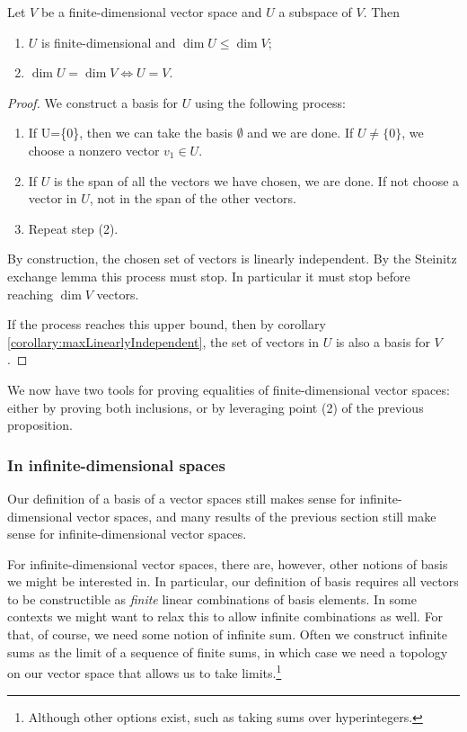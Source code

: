 \begin{proposition}
Let $V$ be a finite-dimensional vector space and $U$ a subspace of $V$. Then
\begin{enumerate}
\item $U$ is finite-dimensional and $\dim U \leq \dim V$;
\item $\dim U = \dim V \iff U=V$.
\end{enumerate}
\label{prop:vectorSpaceEquality}
\end{proposition}
\begin{proof}
We construct a basis for $U$ using the following process:
\begin{enumerate}
\item If U=\{0\}, then we can take the basis $\emptyset$ and we are done. If $U\neq \{0\}$, we choose a nonzero vector $v_1 \in U$.
\item If $U$ is the span of all the vectors we have chosen, we are done. If not choose a vector in $U$, not in the span of the other vectors.
\item Repeat step (2).
\end{enumerate}
By construction, the chosen set of vectors is linearly independent. By the Steinitz exchange lemma this process must stop. In particular it must stop before reaching $\dim V$ vectors.

If the process reaches this upper bound, then by corollary \ref{corollary:maxLinearlyIndependent}, the set of vectors in $U$ is also a basis for $V$.
\end{proof}
We now have two tools for proving equalities of finite-dimensional vector spaces: either by proving both inclusions, or by leveraging point (2) of the previous proposition.

\subsubsection{In infinite-dimensional spaces}
Our definition of a basis of a vector spaces still makes sense for infinite-dimensional vector spaces, and many results of the previous section still make sense for infinite-dimensional vector spaces.

For infinite-dimensional vector spaces, there are, however, other notions of basis we might be interested in. In particular, our definition of basis requires all vectors to be constructible as \emph{finite} linear combinations of basis elements. In some contexts we might want to relax this to allow infinite combinations as well. For that, of course, we need some notion of infinite sum. Often we construct infinite sums as the limit of a sequence of finite sums, in which case we need a topology on our vector space that allows us to take limits.\footnote{Although other options exist, such as taking sums over hyperintegers.}  

